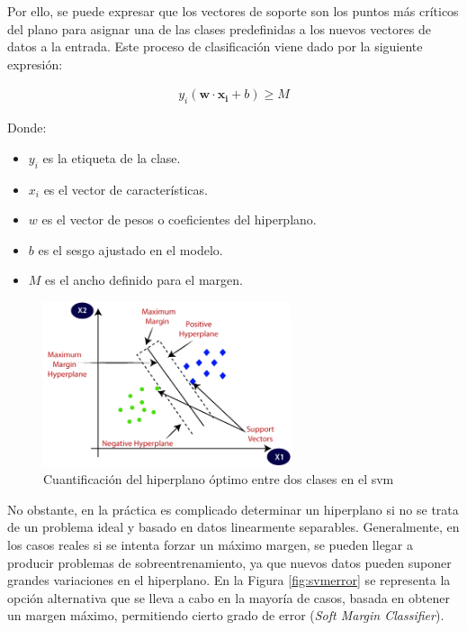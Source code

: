 \vspace{3mm}

Por ello, se puede expresar que los vectores de soporte son los puntos más críticos del plano para asignar una de las clases predefinidas a los nuevos vectores de datos a la entrada. Este proceso de clasificación viene dado por la siguiente expresión: \cite{svmmedium} 

\begin{equation}
    \begin{aligned}
        y_i(\mathbf{w} \cdot \mathbf{x_i} + b) \geq M
    \end{aligned}
\end{equation} 

    Donde:
\begin{itemize}
    \renewcommand{\labelitemi}{}
    \item \(y_i\) es la etiqueta de la clase. 
    \item \(x_i\) es el vector de características.
    \item \(w\) es el vector de pesos o coeficientes del hiperplano.
    \item \(b\) es el sesgo ajustado en el modelo.
    \item \(M\) es el ancho definido para el margen.
\end{itemize}

\vspace{3mm}

\begin{figure}[h!]
    \centering
    \includegraphics[width=0.65\textwidth]{img/teoria/svm.png}
    \caption{Cuantificación del hiperplano óptimo entre dos clases en el \acrshort{svm} \cite{svmmedium2}}
    \label{fig:svm}
\end{figure}

\vspace{3mm}

No obstante, en la práctica es complicado determinar un hiperplano si no se trata de un problema ideal y basado en datos linearmente separables. Generalmente, en los casos reales si se intenta forzar un máximo margen, se pueden llegar a producir problemas de sobreentrenamiento, ya que nuevos datos pueden suponer grandes variaciones en el hiperplano. En la Figura \ref{fig:svmerror} se representa la opción alternativa que se lleva a cabo en la mayoría de casos, basada en obtener un margen máximo, permitiendo cierto grado de error (\textit{Soft Margin Classifier}). \cite{matlab} \cite{svmciencia}

